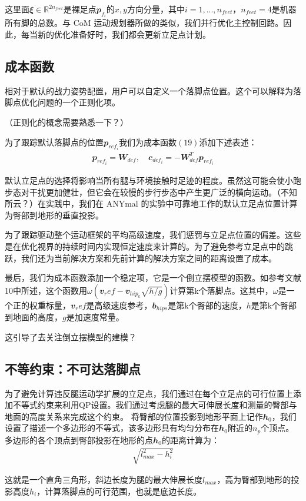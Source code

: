 这里面${\mathbfit \xi}\in {\mathbb R}^{2n_{feet}}$是裸足点${\mathbfit p}_{f_i}$的$x,y$方向分量，其中$i=1,...,n_{feet}$，$n_{feet}=4$是机器所有脚的总数。与 CoM 运动规划器所做的类似，我们并行优化主控制回路。因此，每当新的优化准备好时，我们都会更新立足点计划。
\subsection{成本函数}
相对于默认的战力姿势配置，用户可以自定义一个落脚点位置。这个可以解释为落脚点优化问题的一个正则化项。
\begin{note}
    （正则化的概念需要熟悉一下？）
\end{note}
为了跟踪默认落脚点的位置${\mathbfit p}_{ref_i}$我们为成本函数$(19)$添加下述表述：
\begin{align}
    {\mathbfit p}_{ref_i} = {\mathbfit W}_{def}, \quad {\mathbfit c}_{def_i} = - {\mathbfit W}^T_{def} {\mathbfit p}_{ref_i}
\end{align}

默认立足点的选择将影响当所有腿与环境接触时足迹的程度。虽然这可能会使小跑步态对干扰更加健壮，但它会在较慢的步行步态中产生更广泛的横向运动。（不知所云？）在实践中，我们在 ANYmal 的实验中可靠地工作的默认立足点位置计算为臀部到地形的垂直投影。

为了跟踪驱动整个运动框架的平均高级速度，我们惩罚与立足点位置的偏差。这些是在优化视界的持续时间内实现恒定速度来计算的。为了避免参考立足点中的跳跃，我们还为当前解决方案和先前计算的解决方案之间的距离设置了成本。

最后，我们为成本函数添加一个稳定项，它是一个倒立摆模型的函数。如参考文献10中所述，这个函数用$\omega ({\mathbfit v}_ref - {\mathbfit v}_{hip_k}\sqrt{h/g})$计算第k个落脚点。这其中，$\omega$是一个正的权重标量，${\mathbfit v}_ref$是高级速度参考，${\mathbfit b}_{hips}$是第k个臀部的速度，$h$是第k个臀部到地面的高度，$g$是加速度常量。
\begin{note}
    这引导了去关注倒立摆模型的建模？
\end{note}

\subsection{不等约束：不可达落脚点}
为了避免计算违反腿运动学扩展的立足点，我们通过在每个立足点的可行位置上添加不等式约束来利用QP设置。我们通过考虑腿的最大可伸展长度和测量的臀部与地面的高度关系来完成这个约束。
将臀部的位置投影到地形平面上记作${\mathbfit h}_0$，我们设置了描述一个多边形的不等式，该多边形具有均匀分布在${\mathbfit h}_0$附近的$n_p$个顶点。多边形的各个顶点到臀部投影在地形的点${\mathbfit h}_0$的距离计算为：
\begin{align}
    \sqrt{l_{max}^2 - h_i^2}
\end{align}
\begin{note}
    这就是一个直角三角形，斜边长度为腿的最大伸展长度$l_{max}$，高为臀部到地形的投影高度$h_i$，计算落脚点的可行范围，也就是底边长度。
\end{note}
